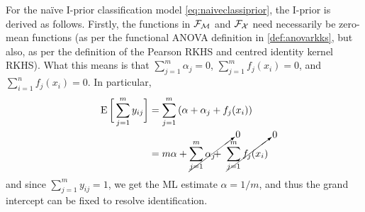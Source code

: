 For the naïve I-prior classification model \cref{eq:naiveclassiprior}, the I-prior is derived as follows.
Firstly, the functions in ${\mathcal F}_{\mathcal M}$ and ${\mathcal F}_{\mathcal X}$ need necessarily be zero-mean functions (as per the functional ANOVA definition in \cref{def:anovarkks}, but also, as per the definition of the Pearson RKHS and centred identity kernel RKHS).
What this means is that $\sum_{j=1}^m \alpha_j = 0$, $\sum_{j=1}^m f_j(x_i) = 0$, and $\sum_{i=1}^n f_j(x_i) = 0$.
In particular,
\begin{align*}
  \E \bigg[ \sum_{j=1}^m y_{ij} \bigg]
  &= \sum_{j=1}^m \left(\alpha + \alpha_j + f_j(x_i) \right) \\
  &= m\alpha + \cancelto{0}{\sum_{j=1}^m \alpha_j \hphantom{aaa}} 
  \hspace{-2em} + \hspace{0.3em} \cancelto{0}{\sum_{j=1}^m f_j(x_i)}
\end{align*}
and since $\sum_{j=1}^m y_{ij} = 1$, we get the ML estimate $\hat\alpha = 1/m$, and thus the grand intercept can be fixed to resolve identification.


